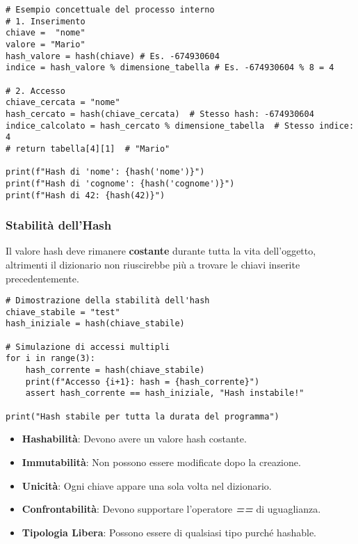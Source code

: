 \begin{lstlisting}
# Esempio concettuale del processo interno
# 1. Inserimento
chiave =  "nome"
valore = "Mario"
hash_valore = hash(chiave) # Es. -674930604
indice = hash_valore % dimensione_tabella # Es. -674930604 % 8 = 4

# 2. Accesso
chiave_cercata = "nome"
hash_cercato = hash(chiave_cercata)  # Stesso hash: -674930604
indice_calcolato = hash_cercato % dimensione_tabella  # Stesso indice: 4
# return tabella[4][1]  # "Mario"

print(f"Hash di 'nome': {hash('nome')}")
print(f"Hash di 'cognome': {hash('cognome')}")
print(f"Hash di 42: {hash(42)}")
\end{lstlisting}
\vspace{0.5cm}

\subsubsection{Stabilità dell'Hash}\label{StabilitàHashDict}
Il valore hash deve rimanere \textbf{costante} durante tutta la vita dell'oggetto, altrimenti il dizionario non riuscirebbe più a trovare 
le chiavi inserite precedentemente.
\vspace{0.3cm}

\begin{lstlisting}
# Dimostrazione della stabilità dell'hash
chiave_stabile = "test"
hash_iniziale = hash(chiave_stabile)

# Simulazione di accessi multipli
for i in range(3):
    hash_corrente = hash(chiave_stabile)
    print(f"Accesso {i+1}: hash = {hash_corrente}")
    assert hash_corrente == hash_iniziale, "Hash instabile!"

print("Hash stabile per tutta la durata del programma")
\end{lstlisting}
\vspace{0.5cm}





\vspace{0.5cm}
\begin{tcolorbox}[colback=blue!5!white,colframe=blue!75!black,title=Caratteristiche principali delle Chiavi]
\begin{itemize}
    \item \textbf{Hashabilità}: Devono avere un valore hash costante.
    
    \item \textbf{Immutabilità}: Non possono essere modificate dopo la creazione.
    
    \item \textbf{Unicità}: Ogni chiave appare una sola volta nel dizionario.
    
    \item \textbf{Confrontabilità}: Devono supportare l'operatore \textit{\textbf{==}} di uguaglianza.
    
    \item \textbf{Tipologia Libera}: Possono essere di qualsiasi tipo purché hashable.
    
\end{itemize}
\end{tcolorbox}


